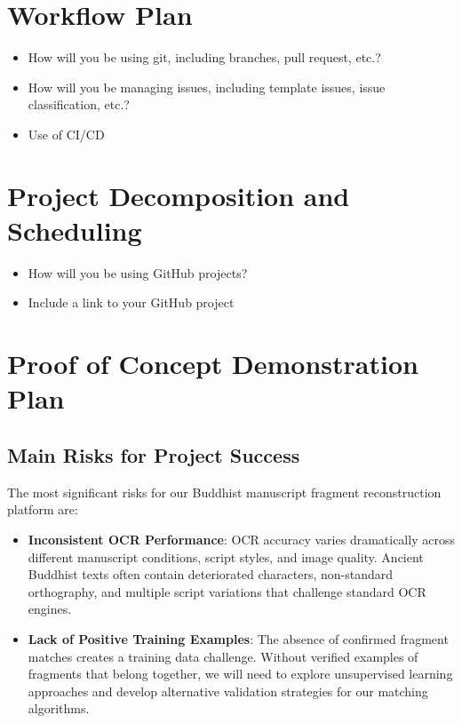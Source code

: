 \documentclass{article}
\begin{document}

\section{Workflow Plan}

\begin{itemize}
	\item How will you be using git, including branches, pull request, etc.?
	\item How will you be managing issues, including template issues, issue
	classification, etc.?
  \item Use of CI/CD
\end{itemize}

\section{Project Decomposition and Scheduling}

\begin{itemize}
  \item How will you be using GitHub projects?
  \item Include a link to your GitHub project
\end{itemize}


\section{Proof of Concept Demonstration Plan}

\subsection{Main Risks for Project Success}

The most significant risks for our Buddhist manuscript fragment reconstruction platform are:

\begin{itemize}
\item \textbf{Inconsistent OCR Performance}: OCR accuracy varies dramatically across different manuscript conditions, script styles, and image quality. Ancient Buddhist texts often contain deteriorated characters, non-standard orthography, and multiple script variations that challenge standard OCR engines.


\item \textbf{Lack of Positive Training Examples}: The absence of confirmed fragment matches creates a training data challenge. Without verified examples of fragments that belong together, we will need to explore unsupervised learning approaches and develop alternative validation strategies for our matching algorithms.
\end{itemize}
\end{document}
